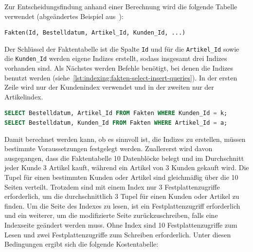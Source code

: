 Zur Entscheidungsfindung anhand einer Berechnung wird die folgende Tabelle verwendet (abgeändertes Beispiel aus~\cite[S. 355--357]{garcia2008database}):
\vspace{-4pt}
\begin{lstlisting}
Fakten(Id, Bestelldatum, Artikel_Id, Kunden_Id, ...)
\end{lstlisting}
\vspace{-8pt}

Der Schlüssel der Faktentabelle ist die Spalte \texttt{Id} und für die \texttt{Artikel\_Id} sowie die \texttt{Kunden\_Id} werden eigene Indizes erstellt, sodass insgesamt drei Indizes vorhanden sind.
Als Nächstes werden Befehle benötigt, bei denen die Indizes benutzt werden (siehe~\ref{lst:indexing:fakten-select-insert-queries}).
In der ersten Zeile wird nur der Kundenindex verwendet und in der zweiten nur der Artikelindex.

\vspace{-12pt}
\begin{lstlisting}[language=SQL,caption=Select-Queries für die Faktentabelle,label={lst:indexing:fakten-select-insert-queries}]
SELECT Bestelldatum, Artikel_Id FROM Fakten WHERE Kunden_Id = k;
SELECT Bestelldatum, Kunden_Id FROM Fakten WHERE Artikel_Id = a;
\end{lstlisting}
\vspace{-8pt}

Damit berechnet werden kann, ob es sinnvoll ist, die Indizes zu erstellen, müssen bestimmte Voraussetzungen festgelegt werden.
Zuallererst wird davon ausgegangen, dass die Faktentabelle 10 Datenblöcke belegt und im Durchschnitt jeder Kunde 3 Artikel kauft, während ein Artikel von 3 Kunden gekauft wird.
Die Tupel für einen bestimmten Kunden oder Artikel sind gleichmäßig über die 10 Seiten verteilt.
Trotzdem sind mit einem Index nur 3 Festplattenzugriffe erforderlich, um die durchschnittlich 3 Tupel für einen Kunden oder Artikel zu finden.
Um die Seite des Indexes zu lesen, ist ein Festplattenzugriff erforderlich und ein weiterer, um die modifizierte Seite zurückzuschreiben, falls eine Indexseite geändert werden muss.
Ohne Index sind 10 Festplattenzugriffe zum Lesen und zwei Festplattenzugriffe zum Schreiben erforderlich.
Unter diesen Bedingungen ergibt sich die folgende Kostentabelle:

